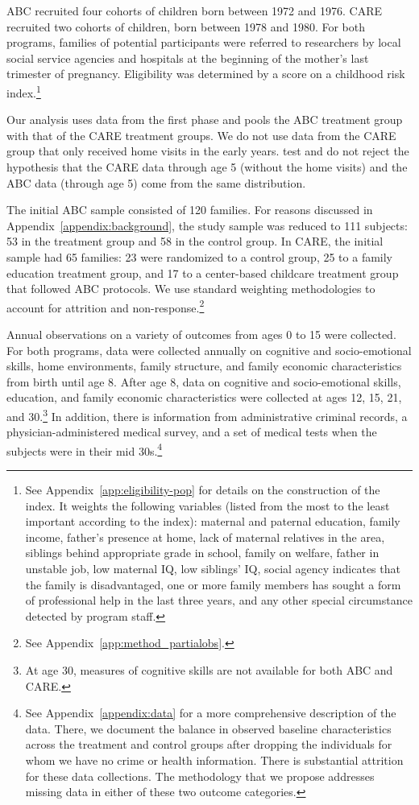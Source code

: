 ABC recruited four cohorts of children born between 1972 and 1976. CARE recruited two cohorts of children, born between 1978 and 1980. For both programs, families of potential participants were referred to researchers by local social service agencies and hospitals at the beginning of the mother's last trimester of pregnancy. Eligibility was determined by a score on a childhood risk index.\footnote{See  Appendix~\ref{app:eligibility-pop} for details on the construction of the index. It weights the following variables (listed from the most to the least important according to the index): maternal and paternal education, family income, father's presence at home, lack of maternal relatives in the area, siblings behind appropriate grade in school, family on welfare, father in unstable job, low maternal IQ, low siblings' IQ, social agency indicates that the family is disadvantaged, one or more family members has sought a form of professional help in the last three years, and any other special circumstance detected by program staff.}

Our analysis uses data from the first phase and pools the ABC treatment group with that of the CARE treatment groups. We do not use data from the CARE group that only received home visits in the early years. \cite{Campbell_Conti_etal_2014_EarlyChildhoodInvestments} test and do not reject the hypothesis that the CARE data through age 5 (without the home visits) and the ABC data (through age 5) come from the same distribution.

The initial ABC sample consisted of 120 families. For reasons discussed in Appendix~\ref{appendix:background}, the study sample was reduced to 111 subjects: 53 in the treatment group and 58 in the control group. In CARE, the initial sample had 65 families: 23 were randomized to a control group, 25 to a family education treatment group, and 17 to a center-based childcare treatment group that followed ABC protocols. We use standard weighting methodologies to account for attrition and non-response.\footnote{See Appendix~\ref{app:method_partialobs}.}

Annual observations on a variety of outcomes from ages 0 to 15 were collected. For both programs, data were collected annually on cognitive and socio-emotional skills, home environments, family structure, and family economic characteristics from birth until age 8. After age 8, data on cognitive and socio-emotional skills, education, and family economic characteristics were collected at ages 12, 15, 21, and 30.\footnote{At age 30, measures of cognitive skills are not available for both ABC and CARE.} In addition, there is information from administrative criminal records, a physician-administered medical survey, and a set of medical tests when the subjects were in their mid 30s.\footnote{See  Appendix~\ref{appendix:data} for a more comprehensive description of the data. There, we document the balance in observed baseline characteristics across the treatment and control groups after dropping the individuals for whom we have no crime or health information. There is substantial attrition for these data collections. The methodology that we propose addresses missing data in either of these two outcome categories.}

